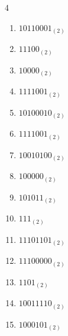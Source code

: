 \begin{multicols}{4}
\begin{enumerate}
        \phantom{$=235$}

  \item $10110001_{(2)}$

        \phantom{$=177$}

\columnbreak %

  \item $11100_{(2)}$

        \phantom{$=28$}

  \item $10000_{(2)}$

        \phantom{$=16$}

  \item $1111001_{(2)}$

        \phantom{$=121$}

  \item $10100010_{(2)}$

        \phantom{$=162$}

  \item $1111001_{(2)}$

        \phantom{$=121$}

  \item $10010100_{(2)}$

        \phantom{$=148$}

  \item $100000_{(2)}$

        \phantom{$=32$}

  \item $101011_{(2)}$

        \phantom{$=43$}

  \item $111_{(2)}$

        \phantom{$=7$}

  \item $11101101_{(2)}$

        \phantom{$=237$}

  \item $11100000_{(2)}$

        \phantom{$=224$}

  \item $1101_{(2)}$

        \phantom{$=13$}

  \item $10011110_{(2)}$

        \phantom{$=158$}

  \item $1000101_{(2)}$


\end{enumerate}
\end{multicols}
